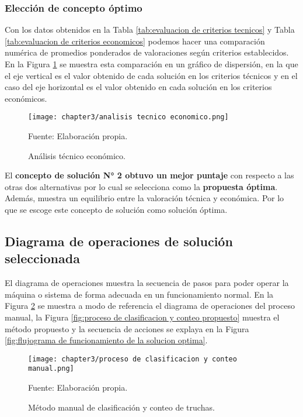 \subsubsection{Elección de concepto óptimo}

Con los datos obtenidos en la Tabla \ref{tab:evaluacion de criterios tecnicos} y Tabla \ref{tab:evaluacion de criterios economicos} podemos hacer una comparación numérica de promedios ponderados de valoraciones según criterios establecidos. En la Figura \ref{fig:analisis tecnico economico} se muestra esta comparación en un gráfico de dispersión, en la que el eje vertical es el valor obtenido de cada solución en los criterios técnicos y en el caso del eje horizontal es el valor obtenido en cada solución en los criterios económicos.

\begin{figure}[H]
	\centering
	\texttt{[image: chapter3/analisis tecnico economico.png]}
	\caption{Análisis técnico económico.}
	\begin{myflushleftportland}
		Fuente: Elaboración propia.
	\end{myflushleftportland}
	\label{fig:analisis tecnico economico}
\end{figure}

El \textbf{concepto de solución N° 2 obtuvo un mejor puntaje} con respecto a las otras dos alternativas por lo cual se selecciona como la \textbf{propuesta óptima}. Además, muestra un equilibrio entre la valoración técnica y económica. Por lo que se escoge este concepto de solución como solución óptima.

\subsection{Diagrama de operaciones de solución seleccionada}

El diagrama de operaciones muestra la secuencia de pasos para poder operar la máquina o sistema de forma adecuada en un funcionamiento normal. En la Figura \ref{fig:proceso de clasificacion y conteo manual} se muestra a modo de referencia el diagrama de operaciones del proceso manual, la Figura \ref{fig:proceso de clasificacion y conteo propuesto} muestra el método propuesto y la secuencia de acciones se explaya en la Figura \ref{fig:flujograma de funcionamiento de la solucion optima}.

\newpage
\pagestyle{mylandscape}

\begin{landscape}
	\begin{figure}[H]
		\centering
		\texttt{[image: chapter3/proceso de clasificacion y conteo manual.png]}
		\caption{Método manual de clasificación y conteo de truchas.}
		\begin{myflushleftportland}
			Fuente: Elaboración propia.
		\end{myflushleftportland}
		\label{fig:proceso de clasificacion y conteo manual}
	\end{figure}
\end{landscape}

